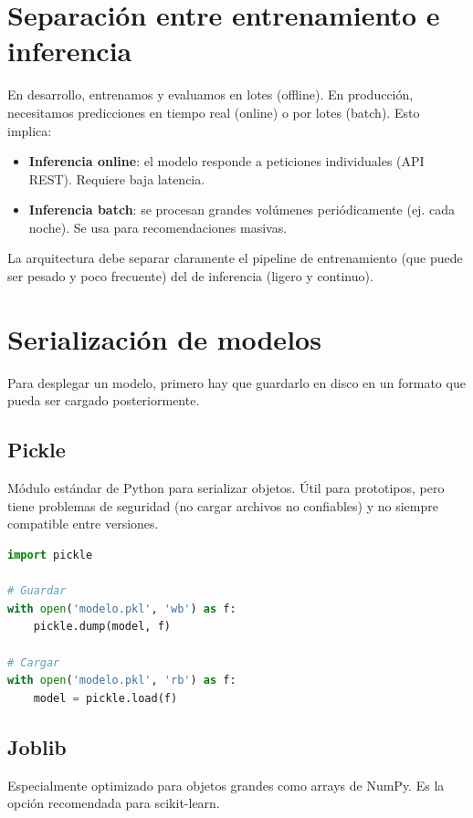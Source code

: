 \documentclass[12pt,a4paper,openany,oneside]{book}
\begin{document}
\section{Separación entre entrenamiento e inferencia}

En desarrollo, entrenamos y evaluamos en lotes (offline). En producción, necesitamos predicciones en tiempo real (online) o por lotes (batch). Esto implica:

\begin{itemize}
    \item \textbf{Inferencia online}: el modelo responde a peticiones individuales (API REST). Requiere baja latencia.
    \item \textbf{Inferencia batch}: se procesan grandes volúmenes periódicamente (ej. cada noche). Se usa para recomendaciones masivas.
\end{itemize}

La arquitectura debe separar claramente el pipeline de entrenamiento (que puede ser pesado y poco frecuente) del de inferencia (ligero y continuo).

\section{Serialización de modelos}

Para desplegar un modelo, primero hay que guardarlo en disco en un formato que pueda ser cargado posteriormente.

\subsection{Pickle}
Módulo estándar de Python para serializar objetos. Útil para prototipos, pero tiene problemas de seguridad (no cargar archivos no confiables) y no siempre compatible entre versiones.

\begin{lstlisting}[language=Python]
import pickle

# Guardar
with open('modelo.pkl', 'wb') as f:
    pickle.dump(model, f)

# Cargar
with open('modelo.pkl', 'rb') as f:
    model = pickle.load(f)
\end{lstlisting}

\subsection{Joblib}
Especialmente optimizado para objetos grandes como arrays de NumPy. Es la opción recomendada para scikit-learn.
\end{document}
